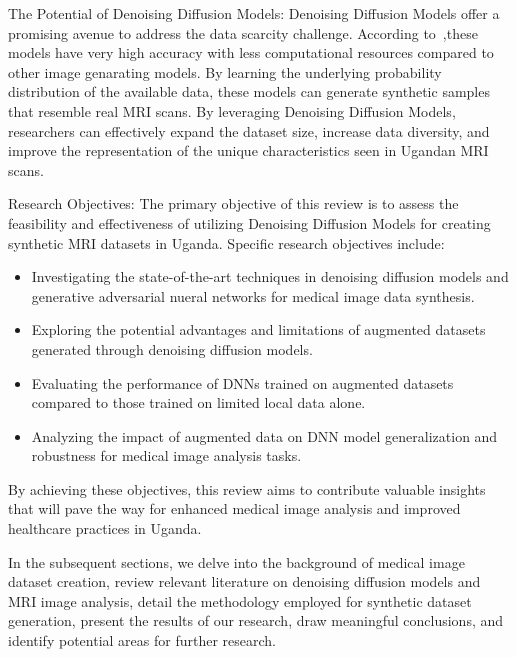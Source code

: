 The Potential of Denoising Diffusion Models:
Denoising Diffusion Models offer a promising avenue to address the data scarcity challenge. According to~\cite{rombach2022high},these models have very high accuracy with less computational resources compared to other image genarating models. By learning the underlying probability distribution of the available data, these models can generate synthetic samples that resemble real MRI scans. By leveraging Denoising Diffusion Models, researchers can effectively expand the dataset size, increase data diversity, and improve the representation of the unique characteristics seen in Ugandan MRI scans.

Research Objectives:
The primary objective of this review is to assess the feasibility and effectiveness of utilizing Denoising Diffusion Models for creating synthetic MRI datasets in Uganda. Specific research objectives include:
\begin{itemize}
    \item Investigating the state-of-the-art techniques in denoising diffusion models and generative adversarial nueral networks for medical image data synthesis.
    \item Exploring the potential advantages and limitations of augmented datasets generated through denoising diffusion models.
    \item Evaluating the performance of DNNs trained on augmented datasets compared to those trained on limited local data alone.
    \item Analyzing the impact of augmented data on DNN model generalization and robustness for medical image analysis tasks.
\end{itemize}
By achieving these objectives, this review aims to contribute valuable insights that will pave the way for enhanced medical image analysis and improved healthcare practices in Uganda.

In the subsequent sections, we delve into the background of medical image dataset creation, review relevant literature on denoising diffusion models and MRI image analysis, detail the methodology employed for synthetic dataset generation, present the results of our research, draw meaningful conclusions, and identify potential areas for further research.




